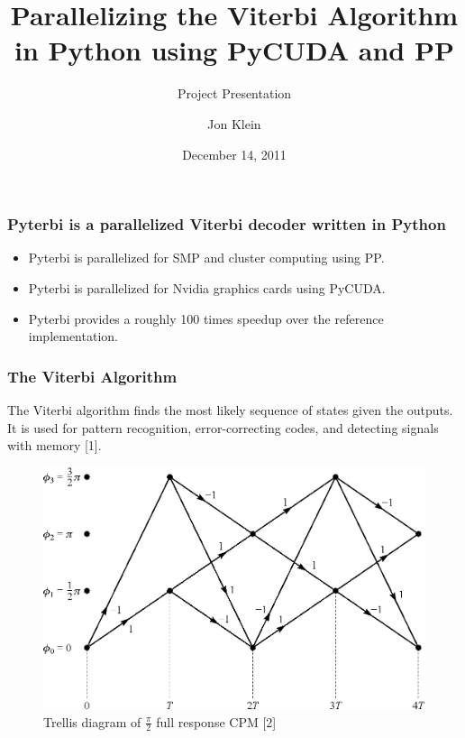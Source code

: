 \documentclass{beamer}
\title{Parallelizing the Viterbi Algorithm in Python using PyCUDA and PP}
\subtitle{Project Presentation}
\author{Jon Klein}
\institute{University of Alaska, Fairbanks}
\date{December 14, 2011}
\begin{document}
    \begin{frame}
        \titlepage
    \end{frame}

    \begin{frame}
        \frametitle{Pyterbi is a parallelized Viterbi decoder written in Python}
        \begin{itemize}
            \item Pyterbi is parallelized for SMP and cluster computing using PP.
            \item Pyterbi is parallelized for Nvidia graphics cards using PyCUDA. 
            \item Pyterbi provides a roughly 100 times speedup over the reference implementation.
        \end{itemize}
    \end{frame}
 
    \begin{frame}
        \frametitle{The Viterbi Algorithm}
        The Viterbi algorithm finds the most likely sequence of states given the outputs.
        It is used for pattern recognition, error-correcting codes, and detecting signals with memory [1].

        \begin{figure}
            \includegraphics[options]{figures/cpmfulltrellis.jpg}
            \caption{Trellis diagram of $\frac{\pi}{2}$ full response CPM [2]}
        \end{figure}

    \end{frame}
    
\end{document}
